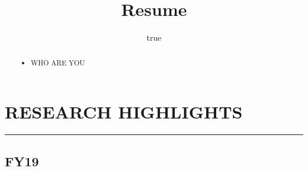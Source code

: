 \documentclass[]{article}
\title{Resume}
\author{true}
\date{}
\providecommand{\tightlist}{%
  \setlength{\itemsep}{0pt}\setlength{\parskip}{0pt}}
\begin{document}
\maketitle
\begin{abstract}
\begin{itemize}
\tightlist
\item
  WHO ARE YOU
\end{itemize}
\end{abstract}

{
\setcounter{tocdepth}{3}
\tableofcontents
}
\newpage

\section{RESEARCH HIGHLIGHTS}\label{research-highlights}

\begin{center}\rule{0.5\linewidth}{\linethickness}\end{center}

\subsection{FY19}\label{fy19}
\end{document}
